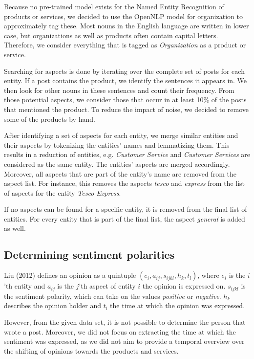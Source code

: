 \documentclass[10pt,a4paper]{article}
\begin{document}
		Because no pre-trained model exists for the Named Entity Recognition of products or services, we decided to use the OpenNLP model for organization to approximately tag these. Most nouns in the English language are written in lower case, but organizations as well as products often contain capital letters. Therefore, we consider everything that is tagged as \textit{Organization} as a product or service.
		
		Searching for aspects is done by iterating over the complete set of posts for each entity. If a post contains the product, we identify the sentences it appears in. We then look for other nouns in these sentences and count their frequency. From those potential aspects, we consider those that occur in at least 10\% of the posts that mentioned the product. To reduce the impact of noise, we decided to remove some of the products by hand.

		After identifying a set of aspects for each entity, we merge similar entities and their aspects by tokenizing the entities' names and lemmatizing them. This results in a reduction of entities, e.g. \textit{Customer Service} and \textit{Customer Services} are considered as the same entity. The entities' aspects are merged accordingly. Moreover, all aspects that are part of the entity's name are removed from the aspect list. For instance, this removes the aspects \textit{tesco} and \textit{express} from the list of aspects for the entity \textit{Tesco Express}.

		If no aspects can be found for a specific entity, it is removed from the final list of entities. For every entity that is part of the final list, the aspect \textit{general} is added as well.

		\subsection{Determining sentiment polarities}
		\label{sec:sentimentpolarities}
		Liu (2012) defines an opinion as a quintuple $(e_i, a_{ij}, s_{ijkl}, h_k, t_l)$, where $e_i$ is the $i$'th entity and $a_{ij}$ is the $j$'th aspect of entity $i$ the opinion is expressed on. $s_{ijkl}$ is the sentiment polarity, which can take on the values \textit{positive} or \textit{negative}. $h_k$ describes the opinion holder and $t_l$ the time at which the opinion was expressed.
		
		However, from the given data set, it is not possible to determine the person that wrote a post. Moreover, we did not focus on extracting the time at which the sentiment was expressed, as we did not aim to provide a temporal overview over the shifting of opinions towards the products and services.
		
\end{document}
